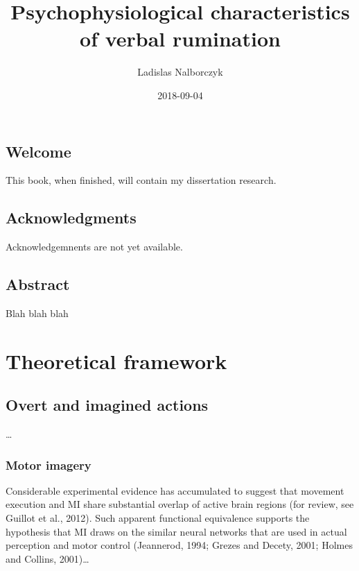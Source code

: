 \documentclass[12pt,]{book}
\title{Psychophysiological characteristics of verbal rumination}
\author{Ladislas Nalborczyk}
\date{2018-09-04}
\begin{document}
\maketitle

{
\setcounter{tocdepth}{1}
\tableofcontents
}
\listoftables
\listoffigures
\chapter*{Welcome}\label{welcome}

This book, when finished, will contain my dissertation research.

\chapter*{Acknowledgments}\label{acknowledgments}

Acknowledgemnents are not yet available.

\chapter*{Abstract}\label{abstract}

Blah blah blah

\part{Theoretical
framework}\label{part-theoretical-framework}

\chapter{Overt and imagined actions}\label{intro}

\ldots{}

\section{Motor imagery}\label{motor-imagery}

Considerable experimental evidence has accumulated to suggest that
movement execution and MI share substantial overlap of active brain
regions (for review, see Guillot et al., 2012). Such apparent functional
equivalence supports the hypothesis that MI draws on the similar neural
networks that are used in actual perception and motor control
(Jeannerod, 1994; Grezes and Decety, 2001; Holmes and Collins,
2001)\ldots{}
\end{document}
